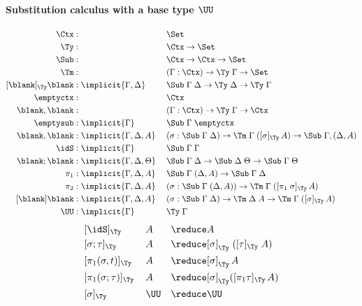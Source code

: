 \documentclass[a4paper,UKenglish,numberwithinsect,cleveref,thm-restate]{lipics-v2021}
\begin{document}
\paragraph*{Substitution calculus with a base type $\UU$}
\begin{alignat*}{3}
  \Ctx      & : && \Set                   \\
  \Ty       & : && \Ctx \to \Set          \\
  \Sub      & : && \Ctx \to \Ctx \to \Set \\
  \Tm       & : && (\Gamma : \Ctx) \to \Ty\;\Gamma \to \Set \\
  [\blank]_{\Ty}\blank & : \implicit{\Gamma, \Delta}\; && \Sub\;\Gamma\;\Delta \to \Ty\;\Delta \to \Ty\;\Gamma \\
  \emptyctx & : && \Ctx \\
  \blank,\blank & : && (\Gamma : \Ctx) \to \Ty\;\Gamma \to \Ctx \\
  \emptysub & : \implicit{\Gamma} && \Sub\;\Gamma\;\emptyctx \\
  \blank,\blank & : \implicit{\Gamma, \Delta, A} && (\sigma : \Sub\;\Gamma\;\Delta) \to \Tm\;\Gamma\;([ \sigma ]_{\Ty}\,A) \to \Sub\;\Gamma,(\Delta, A) \\
  \idS & : \implicit{\Gamma} && \Sub\;\Gamma\;\Gamma \\
  \blank;\blank & : \implicit{\Gamma, \Delta, \Theta} && \Sub\;\Gamma\;\Delta \to \Sub\;\Delta\;\Theta \to \Sub\;\Gamma\;\Theta \\
  \pi_1 & : \implicit{\Gamma, \Delta, A}\; && \Sub\;\Gamma\;(\Delta, A) \to \Sub\;\Gamma\;\Delta \\
  \pi_2 & : \implicit{\Gamma, \Delta, A}\; && (\sigma : \Sub\;\Gamma\;(\Delta, A)) \to \Tm\;\Gamma\;([ \pi_1\;\sigma ]_{\Ty}\, A) \\
  [\blank] \blank & : \implicit{\Gamma,\Delta, A} && (\sigma : \Sub\;\Gamma\;\Delta) \to \Tm\;\Delta\;A \to \Tm\;\Gamma\;([\sigma]_{\Ty}\, A) \\
  \UU     & : \implicit{\Gamma}\; && \Ty\; \Gamma
\end{alignat*}
\begin{alignat*}{5}
  & [ \idS ]_{\Ty}\,               && A           && \reduce A \\
  & [ \sigma ; \tau ]_{\Ty}\,      && A           && \reduce [ \sigma ]_{\Ty}\;([ \tau ]_{\Ty}\;A) \\
  & [ \pi_1(\sigma, t) ]_{\Ty}\,   && A           && \reduce [\sigma]_\Ty\,A \\
  & [ \pi_1(\sigma; \tau) ]_{\Ty}\,&& A           && \reduce [\sigma]_\Ty ([\pi_1\tau]_\Ty \,A) \\
  & [ \sigma ]_{\Ty}\,             && \UU         && \reduce \UU
\end{alignat*}
\end{document}
